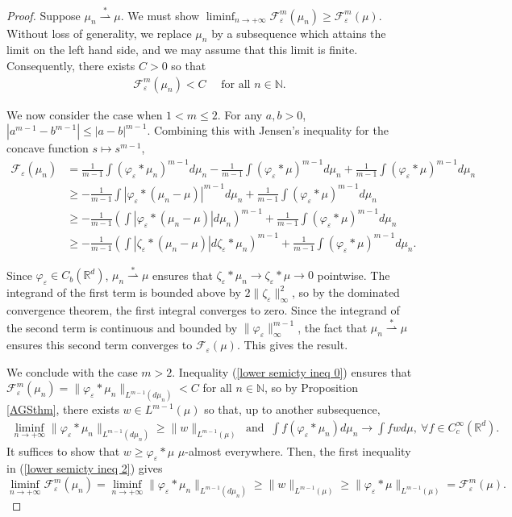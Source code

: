 \documentclass[11pt,leqno]{amsart}
\theoremstyle{definition}
\newcommand{\Rd}{{\mathord{\mathbb R}^d}}
\newcommand{\wsto}{\stackrel{*}{\rightharpoonup}}
\newcommand{\F}{\mathcal{F}}
\def\e{\varepsilon}
\def\F{\mathcal{F}}
\begin{document}
\begin{proof}
Suppose $\mu_n \wsto \mu$. We must show $\liminf_{n \to +\infty} \F^m_\e(\mu_n) \geq \F^m_\e(\mu)$. Without loss of generality, we replace $\mu_n$ by a subsequence which attains the limit on the left hand side, and we may assume that this limit is finite. Consequently, there exists $C>0$ so that 
\begin{align} \label{lower semicty ineq 0} 
\F^m_\e(\mu_n) < C \quad \text{ for all } n \in \mathbb{N} .
\end{align}

We now consider the case when $1 < m \leq 2$. For any $a,b >0$, $|a^{m-1} -b^{m-1}| \leq |a-b|^{m-1}$. Combining this with Jensen's inequality for the concave function $s\mapsto s^{m-1}$,
\begin{align} \label{lower semicty ineq 1}
 \F_\e(\mu_n) &= \frac{1}{m-1} \int (\varphi_\e *\mu_n)^{m-1} d \mu_n - \frac{1}{m-1} \int (\varphi_\e *\mu)^{m-1} d \mu_n + \frac{1}{m-1} \int (\varphi_\e *\mu)^{m-1} d \mu_n   \\
&\geq - \frac{1}{m-1} \int |\varphi_\e *(\mu_n - \mu)|^{m-1} d \mu_n +  \frac{1}{m-1} \int (\varphi_\e *\mu)^{m-1} d \mu_n \nonumber \\
&\geq - \frac{1}{m-1} \left(  \int |\varphi_\e *(\mu_n - \mu)| d \mu_n \right)^{m-1} +  \frac{1}{m-1} \int (\varphi_\e *\mu)^{m-1} d \mu_n \nonumber \\
&\geq - \frac{1}{m-1} \left(  \int |\zeta_\e *(\mu_n - \mu)| d \zeta_\e*\mu_n \right)^{m-1} +  \frac{1}{m-1} \int (\varphi_\e *\mu)^{m-1} d \mu_n . \nonumber
 \end{align}

 Since $\varphi_\e \in C_b(\Rd)$, $\mu_n \wsto \mu$ ensures that $\zeta_\e * \mu_n \to \zeta_\e* \mu \to 0$ pointwise. The integrand of the first term is bounded above by $2\|\zeta_\e\|_\infty^2$, so by the dominated convergence theorem, the first integral converges to zero. Since the integrand of the second term is continuous and bounded by $\|\varphi_\e\|_\infty^{m-1}$, the fact that $\mu_n \wsto \mu$ ensures this second term converges to $\F_\e(\mu)$. This gives the result.

 We conclude with the case $m > 2$. Inequality (\ref{lower semicty ineq 0}) ensures that $\F^m_\e(\mu_n) = \|\varphi_\e*\mu_n\|_{L^{m-1}(d \mu_n)} < C$ for all $n \in \mathbb{N}$, so by Proposition \ref{AGSthm}, there exists $w \in L^{m-1}(\mu)$ so that, up to another subsequence, 
 \begin{align} \label{lower semicty ineq 2} \liminf_{n \to +\infty} \|\varphi_\e*\mu_n\|_{L^{m-1}(d \mu_n)} \geq  \|w\|_{L^{m-1}(\mu)} \ \text{ and } \  \int f (\varphi_\e *\mu_n) d \mu_n \to \int f w d \mu,  \ \forall f \in C^\infty_c(\Rd). 
 \end{align}
 It suffices to show that $w \geq \varphi_\e*\mu$ $\mu$-almost everywhere. Then, the first inequality in (\ref{lower semicty ineq 2}) gives
 \[ \liminf_{n \to +\infty} \F^m_\e(\mu_n) = \liminf_{n \to +\infty} \|\varphi_\e*\mu_n\|_{L^{m-1}(d \mu_n)} \geq  \|w\|_{L^{m-1}(\mu)} \geq \|\varphi_\e*\mu \|_{L^{m-1}(\mu)} = \F_\e^m(\mu) . \]


\end{proof}
\end{document}

